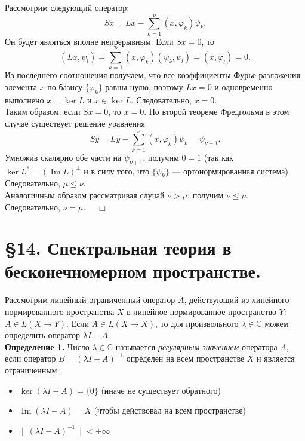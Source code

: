 \documentclass[12pt,a4paper, titlepage]{article}
\renewcommand{\Im}{\mathop{\mathrm{Im}}\nolimits}
\begin{document}
Рассмотрим следующий оператор:
$$
Sx = Lx - \sum_{k=1}^\nu (x, \varphi_k) \psi_k.
$$
Он будет являться вполне непрерывным. Если $Sx = 0$, то
$$
(Lx, \psi_l) = \sum_{k=1}^\nu (x, \varphi_k)(\psi_k, \psi_l) = (x, \varphi_l) = 0.
$$
Из последнего соотношения получаем, что все коэффициенты Фурье разложения элемента $x$ по базису $\{\varphi_k\}$ равны нулю, поэтому $Lx = 0$ и одновременно выполнено $x \perp \ker L$ и $x \in \ker L$. Следовательно, $x = 0$.\\

Таким образом, если $Sx = 0$, то $x = 0$. По второй теореме Фредгольма в этом случае существует решение уравнения
$$
Sy = Ly - \sum_{k=1}^\nu (x, \varphi_k) \psi_k = \psi_{\nu + 1}.
$$
Умножив скалярно обе части на $\psi_{\nu + 1}$, получим $0 = 1$ (так как $\ker L^* = (\Im L)^\perp$ и в силу того, что $\{\psi_k\}$ --- ортонормированная система). Следовательно, $\mu \leqslant \nu$.\\

Аналогичным образом рассматривая случай $\nu > \mu$, получим $\nu \leqslant \mu$. Следовательно, $\nu = \mu$. $\quad\Box$\\



\section*{ \S 14. Спектральная теория в бесконечномерном пространстве.}

Рассмотрим линейный ограниченный оператор $A$, действующий из линейного нормированного пространства $X$ в линейное нормированное пространство $Y$: $A \in L(X \to Y).$ Если $A \in L(X \to X)$, то для произвольного $\lambda \in \mathbb{C}$ можем определить оператор $\lambda I - A$.\\

\textbf{Определение 1.} Число $\lambda \in \mathbb{C}$ называется \textit{регулярным значением} оператора $A$, если оператор $B = (\lambda I - A)^{-1}$ определен на всем пространстве $X$ и является ограниченным:

\begin{itemize}
\item $\ker (\lambda I - A) = \{0\}$ (иначе не существует обратного)
\item $\Im (\lambda I - A) = X$ (чтобы действовал на всем пространстве)
\item $\|(\lambda I - A)^{-1}\| < +\infty$
\end{itemize}
\end{document}
